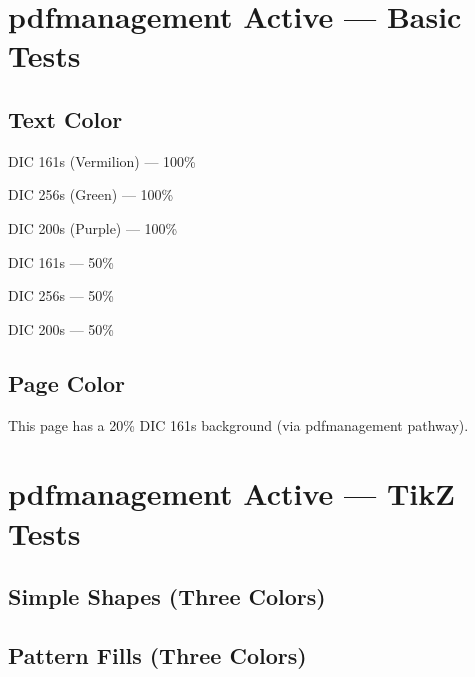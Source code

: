 \documentclass{article}\listfiles\pagestyle{empty}
\newcommand\onelineskip{\par\vspace{\baselineskip}\par}
\begin{document}
\sffamily\bfseries

\section{pdfmanagement Active --- Basic Tests}

\subsection*{Text Color}

\textcolor{DIC161s}{DIC 161s (Vermilion) --- 100\%}\par
\textcolor{DIC256s}{DIC 256s (Green) --- 100\%}\par
\textcolor{DIC200s}{DIC 200s (Purple) --- 100\%}

\onelineskip

\textcolor{DIC161s!50}{DIC 161s --- 50\%}\par
\textcolor{DIC256s!50}{DIC 256s --- 50\%}\par
\textcolor{DIC200s!50}{DIC 200s --- 50\%}

\subsection*{Page Color}

\clearpage
\pagecolor{DIC161s!20}

This page has a 20\% DIC 161s background (via pdfmanagement pathway).

\clearpage
\nopagecolor

\section{pdfmanagement Active --- TikZ Tests}

\subsection*{Simple Shapes (Three Colors)}


\onelineskip

\subsection*{Pattern Fills (Three Colors)}
\end{document}
